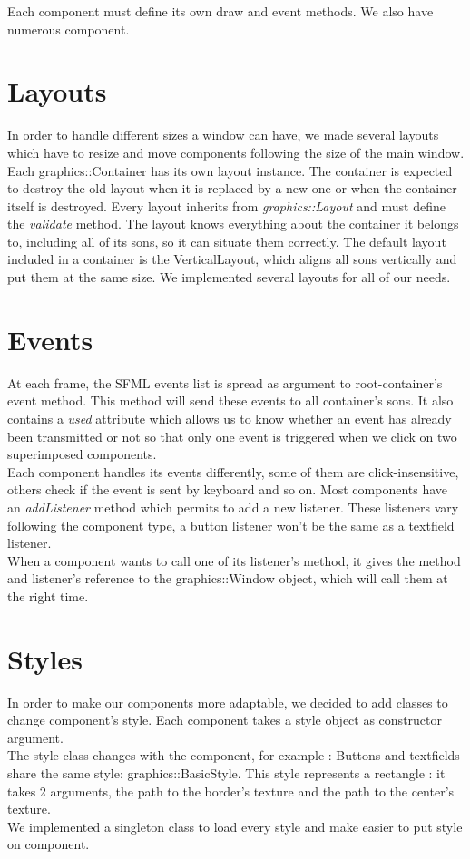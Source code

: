 \documentclass{scrreprt}
\begin{document}
			Each component must define its own draw and event methods.
			We also have numerous component.

		  \section{Layouts}
		  In order to handle different sizes a window can have, we made several layouts which have to resize and move components following the size of the main window. Each graphics::Container has its own layout instance. The container is expected to destroy the old layout when it is replaced by a new one or when the container itself is destroyed. Every layout inherits from \emph{graphics::Layout} and must define the \emph{validate} method. 
		  The layout knows everything about the container it belongs to, including all of its sons, so it can situate them correctly.
	The default layout included in a container is the VerticalLayout, which aligns all sons vertically and put them at the same size.
We implemented several layouts for all of our needs.

	\section{Events}
	At each frame, the SFML events list is spread as argument to root-container's event method. This method will send these events to all container's sons. It also contains a \emph{used} attribute which allows us to know whether an event has already been transmitted or not so that only one event is triggered when we click on two superimposed components.\\

	Each component handles its events differently, some of them are click-insensitive, others check if the event is sent by keyboard and so on.
	Most components have an \emph{addListener} method which permits to add a new listener. These listeners vary following the component type, a button listener won't be the same as a textfield listener.\\

	When a component wants to call one of its listener's method, it gives the method and listener's reference to the graphics::Window object, which will call them at the right time.

	\section{Styles}
	In order to make our components more adaptable, we decided to add classes to change component's style. Each component takes a style object as constructor argument.\\
	The style class changes with the component, for example : Buttons and textfields share the same style: graphics::BasicStyle. This style represents a rectangle : it takes 2 arguments, the path to the border's texture and the path to the center's texture.\\
	We implemented a singleton class to load every style and make easier to put style on component. 
\end{document}
